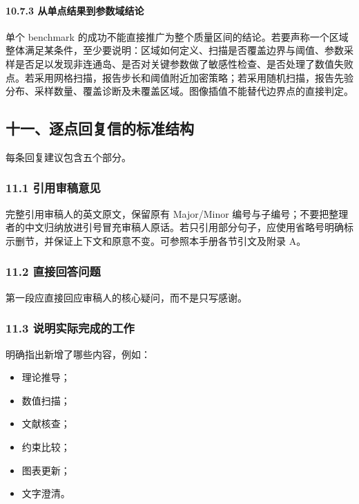 \documentclass[
]{article}
\providecommand{\tightlist}{%
  \setlength{\itemsep}{0pt}\setlength{\parskip}{0pt}}
\begin{document}
\paragraph{10.7.3
从单点结果到参数域结论}\label{ux4eceux5355ux70b9ux7ed3ux679cux5230ux53c2ux6570ux57dfux7ed3ux8bba}

单个 benchmark
的成功不能直接推广为整个质量区间的结论。若要声称一个区域整体满足某条件，至少要说明：区域如何定义、扫描是否覆盖边界与阈值、参数采样是否足以发现非连通岛、是否对关键参数做了敏感性检查、是否处理了数值失败点。若采用网格扫描，报告步长和阈值附近加密策略；若采用随机扫描，报告先验分布、采样数量、覆盖诊断及未覆盖区域。图像插值不能替代边界点的直接判定。

\subsection{十一、逐点回复信的标准结构}\label{ux5341ux4e00ux9010ux70b9ux56deux590dux4fe1ux7684ux6807ux51c6ux7ed3ux6784}

每条回复建议包含五个部分。

\subsubsection{11.1
引用审稿意见}\label{ux5f15ux7528ux5ba1ux7a3fux610fux89c1}

完整引用审稿人的英文原文，保留原有 Major/Minor
编号与子编号；不要把整理者的中文归纳放进引号冒充审稿人原话。若只引用部分句子，应使用省略号明确标示删节，并保证上下文和原意不变。可参照本手册各节引文及附录
A。

\subsubsection{11.2
直接回答问题}\label{ux76f4ux63a5ux56deux7b54ux95eeux9898}

第一段应直接回应审稿人的核心疑问，而不是只写感谢。

\subsubsection{11.3
说明实际完成的工作}\label{ux8bf4ux660eux5b9eux9645ux5b8cux6210ux7684ux5de5ux4f5c}

明确指出新增了哪些内容，例如：

\begin{itemize}
\tightlist
\item
  理论推导；
\item
  数值扫描；
\item
  文献核查；
\item
  约束比较；
\item
  图表更新；
\item
  文字澄清。
\end{itemize}
\end{document}
